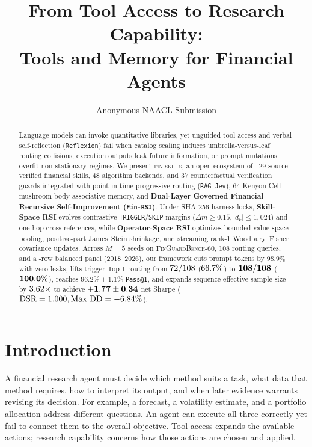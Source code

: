 \documentclass[11pt]{article}
\title{From Tool Access to Research Capability:\\Tools and Memory for Financial Agents}
\author{Anonymous NAACL Submission}
\date{}
\begin{document}
\maketitle
\nolinenumbers
\begin{abstract}
Language models can invoke quantitative libraries, yet unguided tool access and verbal
self-reflection (\texttt{Reflexion}) fail when catalog scaling induces umbrella-versus-leaf
routing collisions, execution outputs leak future information, or prompt mutations overfit
non-stationary regimes. We present \textsc{fin-skills}, an open ecosystem of 129
source-verified financial skills, 48 algorithm backends, and 37 counterfactual verification
guards integrated with point-in-time progressive routing (\texttt{RAG-Jev}), 64-Kenyon-Cell
mushroom-body associative memory, and \textbf{Dual-Layer Governed Financial Recursive
Self-Improvement (\texttt{Fin-RSI})}. Under SHA-256 harness locks, \textbf{Skill-Space RSI}
evolves contrastive \texttt{TRIGGER}/\texttt{SKIP} margins ($\Delta m \ge 0.15, |d_k| \le 1{,}024$)
and one-hop cross-references, while \textbf{Operator-Space RSI} optimizes bounded value-space
pooling, positive-part James--Stein shrinkage, and streaming rank-1 Woodbury--Fisher
covariance updates. Across $M=5$ seeds on \textsc{FinGuardBench-60}, 108 routing queries,
and a \PanelBalancedRows{}-row balanced panel ($2018\text{--}2026$), our framework cuts
prompt tokens by $98.9\%$ with zero leaks, lifts trigger Top-1 routing from
$72{}/108$ ($66.7{}\%$) to
$\mathbf{108{}/108}$ ($\mathbf{100.0{}\%}$), reaches
$96.2\% \pm 1.1\%$ \texttt{Pass@1}, and expands sequence effective sample size by
$3.62{}\times$ to achieve $\mathbf{+1.77{} \pm 0.34{}}$
net Sharpe ($\text{DSR} = 1.000{}, \text{Max DD} = -6.84{}\%$).
\end{abstract}

\section{Introduction}
A financial research agent must decide which method suits a task, what data that method
requires, how to interpret its output, and when later evidence warrants revising its
decision. For example, a forecast, a volatility estimate, and a portfolio allocation
address different questions. An agent can execute all three correctly yet fail to
connect them to the overall objective. Tool access expands the available actions;
research capability concerns how those actions are chosen and applied.
\end{document}

